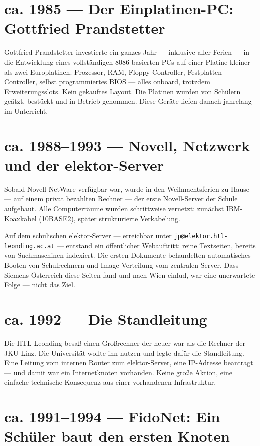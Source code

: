 \documentclass[a4paper,12pt]{article}
\begin{document}
\section{ca. 1985 --- Der Einplatinen-PC: Gottfried Prandstetter}

Gottfried Prandstetter investierte ein ganzes Jahr --- inklusive aller Ferien --- in die Entwicklung eines vollständigen 8086-basierten PCs auf einer Platine kleiner als zwei Europlatinen. Prozessor, RAM, Floppy-Controller, Festplatten-Controller, selbst programmiertes BIOS --- alles onboard, trotzdem Erweiterungsslots. Kein gekauftes Layout. Die Platinen wurden von Schülern geätzt, bestückt und in Betrieb genommen. Diese Geräte liefen danach jahrelang im Unterricht.

\section{ca. 1988--1993 --- Novell, Netzwerk und der elektor-Server}

Sobald Novell NetWare verfügbar war, wurde in den Weihnachtsferien zu Hause --- auf einem privat bezahlten Rechner --- der erste Novell-Server der Schule aufgebaut. Alle Computerräume wurden schrittweise vernetzt: zunächst IBM-Koaxkabel (10BASE2), später strukturierte Verkabelung.

Auf dem schulischen elektor-Server --- erreichbar unter \texttt{jp@elektor.htl-leonding.ac.at} --- entstand ein öffentlicher Webauftritt: reine Textseiten, bereits von Suchmaschinen indexiert. Die ersten Dokumente behandelten automatisches Booten von Schulrechnern und Image-Verteilung vom zentralen Server. Dass Siemens Österreich diese Seiten fand und nach Wien einlud, war eine unerwartete Folge --- nicht das Ziel.

\section{ca. 1992 --- Die Standleitung}

Die HTL Leonding besaß einen Großrechner der neuer war als die Rechner der JKU Linz. Die Universität wollte ihn nutzen und legte dafür die Standleitung. Eine Leitung vom internen Router zum elektor-Server, eine IP-Adresse beantragt --- und damit war ein Internetknoten vorhanden. Keine große Aktion, eine einfache technische Konsequenz aus einer vorhandenen Infrastruktur.

\section{ca. 1991--1994 --- FidoNet: Ein Schüler baut den ersten Knoten}
\end{document}
